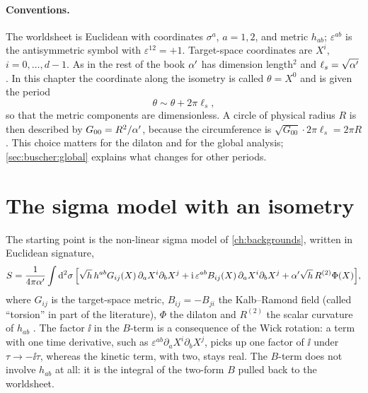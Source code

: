 \paragraph{Conventions.} The worldsheet is Euclidean with coordinates $\sigma^a$, $a=1,2$, and
metric $h_{ab}$; $\varepsilon^{ab}$ is the antisymmetric symbol with $\varepsilon^{12}=+1$.
Target-space coordinates are $X^i$, $i=0,\dots,d-1$. As in the rest of the book $\alpha'$ has
dimension length$^2$ and $\ell_s=\sqrt{\alpha'}$. In this chapter the coordinate along the
isometry is called $\theta=X^0$ and is given the period
\begin{equation}\label{eq:buscher:period}
 \theta\sim\theta+2\pi\ell_s ,
\end{equation}
so that the metric components are dimensionless. A circle of physical radius $R$ is then
described by $G_{00}=R^2/\alpha'$, because the circumference is
$\sqrt{G_{00}}\cdot2\pi\ell_s=2\pi R$. This choice matters for the dilaton and for the global
analysis; \cref{sec:buscher:global} explains what changes for other periods.

\section{The sigma model with an isometry}\label{sec:buscher:setup}

The starting point is the non-linear sigma model of \cref{ch:backgrounds},
written in Euclidean signature,
\begin{equation}\label{eq:buscher:sigma}
 S=\frac{1}{4\pi\alpha'}\int\mathrm{d}^2\sigma\,\Big[\sqrt{h}\,h^{ab}G_{ij}(X)\,\partial_aX^i\partial_bX^j
   +\mathrm{i}\,\varepsilon^{ab}B_{ij}(X)\,\partial_aX^i\partial_bX^j
   +\alpha'\sqrt{h}\,R^{(2)}\Phi(X)\Big],
\end{equation}
where $G_{ij}$ is the target-space metric, $B_{ij}=-B_{ji}$ the Kalb--Ramond
field (called ``torsion'' in part of the literature), $\Phi$ the
dilaton and $R^{(2)}$ the scalar curvature of $h_{ab}$
. The factor $\ii$ in the $B$-term is a consequence of the
Wick rotation: a term with one time derivative, such as
$\varepsilon^{ab}\partial_aX^i\partial_bX^j$, picks up one factor of $\ii$ under
$\tau\to-\ii\tau$, whereas the kinetic term, with two, stays real. The $B$-term does not
involve $h_{ab}$ at all: it is the integral of the two-form $B$ pulled back to the worldsheet.


